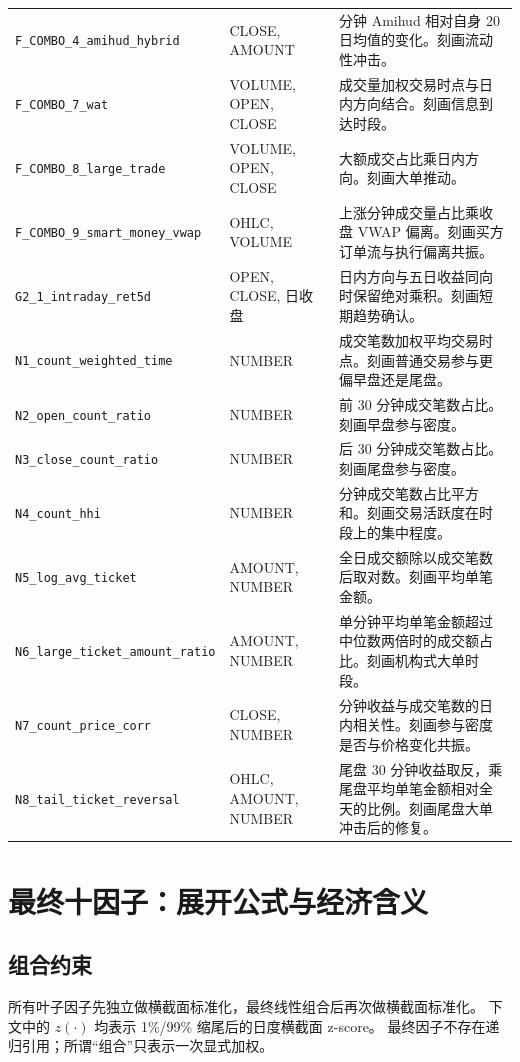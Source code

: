 \documentclass[UTF8,11pt,a4paper]{ctexart}
\newcommand{\z}[1]{z\!\left(#1\right)}
\begin{document}
\begin{longtable}{p{3.7cm}p{3.0cm}p{7.8cm}}
\texttt{F\_COMBO\_4\_amihud\_hybrid} & CLOSE, AMOUNT & 分钟 Amihud 相对自身 20 日均值的变化。刻画流动性冲击。\\
\texttt{F\_COMBO\_7\_wat} & VOLUME, OPEN, CLOSE & 成交量加权交易时点与日内方向结合。刻画信息到达时段。\\
\texttt{F\_COMBO\_8\_large\_trade} & VOLUME, OPEN, CLOSE & 大额成交占比乘日内方向。刻画大单推动。\\
\texttt{F\_COMBO\_9\_smart\_money\_vwap} & OHLC, VOLUME & 上涨分钟成交量占比乘收盘 VWAP 偏离。刻画买方订单流与执行偏离共振。\\
\texttt{G2\_1\_intraday\_ret5d} & OPEN, CLOSE, 日收盘 & 日内方向与五日收益同向时保留绝对乘积。刻画短期趋势确认。\\
\texttt{N1\_count\_weighted\_time} & NUMBER & 成交笔数加权平均交易时点。刻画普通交易参与更偏早盘还是尾盘。\\
\texttt{N2\_open\_count\_ratio} & NUMBER & 前 30 分钟成交笔数占比。刻画早盘参与密度。\\
\texttt{N3\_close\_count\_ratio} & NUMBER & 后 30 分钟成交笔数占比。刻画尾盘参与密度。\\
\texttt{N4\_count\_hhi} & NUMBER & 分钟成交笔数占比平方和。刻画交易活跃度在时段上的集中程度。\\
\texttt{N5\_log\_avg\_ticket} & AMOUNT, NUMBER & 全日成交额除以成交笔数后取对数。刻画平均单笔金额。\\
\texttt{N6\_large\_ticket\_amount\_ratio} & AMOUNT, NUMBER & 单分钟平均单笔金额超过中位数两倍时的成交额占比。刻画机构式大单时段。\\
\texttt{N7\_count\_price\_corr} & CLOSE, NUMBER & 分钟收益与成交笔数的日内相关性。刻画参与密度是否与价格变化共振。\\
\texttt{N8\_tail\_ticket\_reversal} & OHLC, AMOUNT, NUMBER & 尾盘 30 分钟收益取反，乘尾盘平均单笔金额相对全天的比例。刻画尾盘大单冲击后的修复。\\
\bottomrule
\end{longtable}
\normalsize

\section{最终十因子：展开公式与经济含义}

\subsection{组合约束}

所有叶子因子先独立做横截面标准化，最终线性组合后再次做横截面标准化。
下文中的 $\z{\cdot}$ 均表示 1\%/99\% 缩尾后的日度横截面 z-score。
最终因子不存在递归引用；所谓“组合”只表示一次显式加权。
\end{document}
